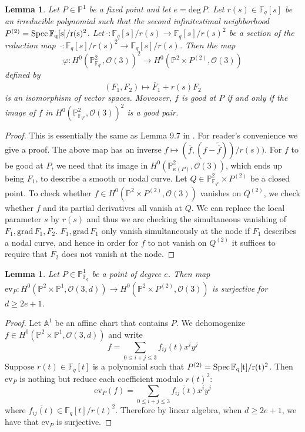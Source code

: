 \documentclass[12pt]{article}
\theoremstyle{plain}
\newtheorem{lemma}[equation]{Lemma}
\theoremstyle{definition}
\newcommand{\IA}{\mathbb{A}}
\newcommand{\IF}{\mathbb{F}}
\newcommand{\IP}{\mathbb{P}}
\newcommand{\sO}{\mathcal{O}}
\renewcommand{\deg}{\mathrm{deg}\,}
\newcommand{\Spec}{\rm Spec\,}
\newcommand{\<}{\langle}
\renewcommand{\>}{\rangle}
\def\wt{\widetilde}
\newcommand{\grad}{\mathrm{grad}\,}
\newcommand{\ev}{\mathrm{ev}}
\begin{document}
\begin{lemma}
Let $P \in \IP^1$ be a fixed point and let $e = \deg P$. Let $r(s) \in \IF_q[s]$ be an irreducible polynomial such that the second infinitestimal neighborhood $P^{(2)} = \Spec \IF_q[s]/r(s)^2$. Let $\, \wt{} : \IF_q[s]/r(s) \to \IF_q[s]/r(s)^2$ be a section of the reduction map $\, \bar{} : \IF_q[s]/r(s)^2 \to \IF_q[s]/r(s)$. Then the map
$$ \varphi : H^0(\IP^2_{\IF_{q^e}} , \sO(3))^2 \to H^0(\IP^2 \times P^{(2)}, \sO(3))$$ defined by 
$$ (F_1, F_2) \mapsto \wt{F_1} + r(s) F_2 $$
is an isomorphism of vector spaces. Moveover, $f$ is good at $P$ if and only if the image of $f$ in $H^0(\IP^2_{\IF_{q^e}} , \sO(3))^2$ is a good pair. 
\end{lemma}
\begin{proof}
This is essentially the same as Lemma 9.7 in \cite{Wood}. For reader's convenience we give a proof. The above map has an inverse $f \mapsto (\overline{f}, (f - \wt{\overline{f}}))/r(s))$. For $f$ to be good at $P$, we need that its image in $H^0(\IP^2_{\kappa(P)}, \sO(3))$, which ends up being $F_1$, to describe a smooth or nodal curve. Let $Q \in \IP^2_{\IF_{q^e}} \times P^{(2)}$ be a closed point. To check whether $f \in H^0(\IP^2 \times P^{(2)}, \sO(3))$ vanishes on $Q^{(2)}$, we check whether $f$ and its partial derivatives all vanish at $Q$. We can replace the local parameter $s$ by $r(s)$ and thus we are checking the simultaneous vanishing of $F_1, \grad F_1, F_2$. $F_1, \grad F_1$ only vanish simultaneously at the node if $F_1$ describes a nodal curve, and hence in order for $f$ to not vanish on $Q^{(2)}$ it suffices to require that $F_2$ does not vanish at the node. 
\end{proof}
\begin{lemma}
\label{pointsurj}
Let $P \in \IP^1_{\IF_q}$ be a point of degree $e$. Then map $\ev_P : H^0(\IP^2 \times \IP^1, \sO(3, d)) \to H^0(\IP^2 \times P^{(2)}, \sO(3))$ is surjective for $d \ge 2e + 1$. 
\end{lemma}
\begin{proof}
Let $\IA^1$ be an affine chart that contains $P$. We dehomogenize $f \in H^0(\IP^2 \times \IP^1, \sO(3, d))$ and write $$f = \sum_{0 \le i + j \le 3} f_{ij}(t) x^i y^j$$ Suppose $r(t) \in \IF_q[t]$ is a polynomial such that $P^{(2)} = \Spec \IF_q[t]/r(t)^2$. Then $\ev_P$ is nothing but reduce each coefficient modulo $r(t)^2$:
$$ \ev_P(f) = \sum_{0 \le i + j \le 3} \overline{f_{ij}(t)}x^i y^j $$ 
where $\overline{f_{ij}(t)} \in \IF_q[t]/r(t)^2$. Therefore by linear algebra, when $d \ge 2e + 1$, we have that $\ev_P$ is surjective. 
\end{proof}
\end{document}
